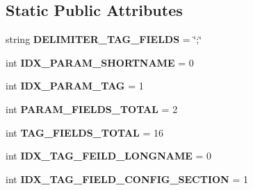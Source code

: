 \subsection*{Static Public Attributes}
\begin{DoxyCompactItemize}
\item 
string {\bfseries D\+E\+L\+I\+M\+I\+T\+E\+R\+\_\+\+T\+A\+G\+\_\+\+F\+I\+E\+L\+DS} = \char`\"{};\char`\"{}\hypertarget{classnegui_1_1pgparamset_1_1PGParamSet_a40e875db5bb216d88fee5fbce8bf229c}{}\label{classnegui_1_1pgparamset_1_1PGParamSet_a40e875db5bb216d88fee5fbce8bf229c}

\item 
int {\bfseries I\+D\+X\+\_\+\+P\+A\+R\+A\+M\+\_\+\+S\+H\+O\+R\+T\+N\+A\+ME} = 0\hypertarget{classnegui_1_1pgparamset_1_1PGParamSet_a5f0fb3e2685ab478b2cc610ddb3cb4ae}{}\label{classnegui_1_1pgparamset_1_1PGParamSet_a5f0fb3e2685ab478b2cc610ddb3cb4ae}

\item 
int {\bfseries I\+D\+X\+\_\+\+P\+A\+R\+A\+M\+\_\+\+T\+AG} = 1\hypertarget{classnegui_1_1pgparamset_1_1PGParamSet_aafe4650bfa58bd9751cdaa173b910c75}{}\label{classnegui_1_1pgparamset_1_1PGParamSet_aafe4650bfa58bd9751cdaa173b910c75}

\item 
int {\bfseries P\+A\+R\+A\+M\+\_\+\+F\+I\+E\+L\+D\+S\+\_\+\+T\+O\+T\+AL} = 2\hypertarget{classnegui_1_1pgparamset_1_1PGParamSet_aeaf803935c95ef6865aa8bc827290cde}{}\label{classnegui_1_1pgparamset_1_1PGParamSet_aeaf803935c95ef6865aa8bc827290cde}

\item 
int {\bfseries T\+A\+G\+\_\+\+F\+I\+E\+L\+D\+S\+\_\+\+T\+O\+T\+AL} = 16\hypertarget{classnegui_1_1pgparamset_1_1PGParamSet_a05678f5c1eb01e51e5f7e5f746eed310}{}\label{classnegui_1_1pgparamset_1_1PGParamSet_a05678f5c1eb01e51e5f7e5f746eed310}

\item 
int {\bfseries I\+D\+X\+\_\+\+T\+A\+G\+\_\+\+F\+E\+I\+L\+D\+\_\+\+L\+O\+N\+G\+N\+A\+ME} = 0\hypertarget{classnegui_1_1pgparamset_1_1PGParamSet_a8df35573197d7171fbb6c900b6dcb057}{}\label{classnegui_1_1pgparamset_1_1PGParamSet_a8df35573197d7171fbb6c900b6dcb057}

\item 
int {\bfseries I\+D\+X\+\_\+\+T\+A\+G\+\_\+\+F\+I\+E\+L\+D\+\_\+\+C\+O\+N\+F\+I\+G\+\_\+\+S\+E\+C\+T\+I\+ON} = 1\hypertarget{classnegui_1_1pgparamset_1_1PGParamSet_ac9ea8e939528fa5975acdfd6c0184d7b}{}\label{classnegui_1_1pgparamset_1_1PGParamSet_ac9ea8e939528fa5975acdfd6c0184d7b}


\end{DoxyCompactItemize}
